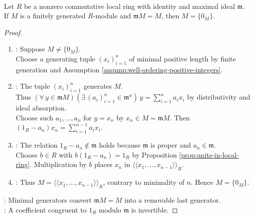 \begin{theorem} \label{thm:nakayama-local-vanishing} \\
Let $R$ be a nonzero commutative local ring with identity and maximal ideal $\mathfrak{m}$.\\
If $M$ is a finitely generated $R$-module and $\mathfrak{m}M=M$, then $M=\{0_M\}$.
\begin{proof}
\begin{enumerate}[label=(\roman*)]
\setlength{\itemsep}{0pt}
\item {}: Suppose $M\neq\{0_M\}$.\\
Choose a generating tuple $(x_i)_{i=1}^n$ of minimal positive length by finite generation and Assumption \ref{assump:well-ordering-positive-integers}.
\item {}: The tuple $(x_i)_{i=1}^n$ generates $M$.\\
Thus $(\forall\,y\in\mathfrak{m}M)(\exists\,(a_i)_{i=1}^n\in\mathfrak{m}^n)\,y=\sum\limits_{i=1}^na_ix_i$ by distributivity and ideal absorption.\\
Choose such $a_1,\ldots,a_n$ for $y=x_n$ by $x_n\in M=\mathfrak{m}M$. Then $(1_R-a_n)x_n=\sum\limits_{i=1}^{n-1}a_ix_i$.
\item {}: The relation $1_R-a_n\notin\mathfrak{m}$ holds because $\mathfrak{m}$ is proper and $a_n\in\mathfrak{m}$.\\
Choose $b\in R$ with $b(1_R-a_n)=1_R$ by Proposition \ref{prop:units-in-local-ring}. Multiplication by $b$ places $x_n$ in $\langle\!\langle x_1,\ldots,x_{n-1}\rangle\!\rangle_R$.
\item {}: Thus $M=\langle\!\langle x_1,\ldots,x_{n-1}\rangle\!\rangle_R$, contrary to minimality of $n$. Hence $M=\{0_M\}$.
\end{enumerate}
: Minimal generators convert $\mathfrak{m}M=M$ into a removable last generator.\\
: A coefficient congruent to $1_R$ modulo $\mathfrak{m}$ is invertible.
\end{proof}
\end{theorem}

